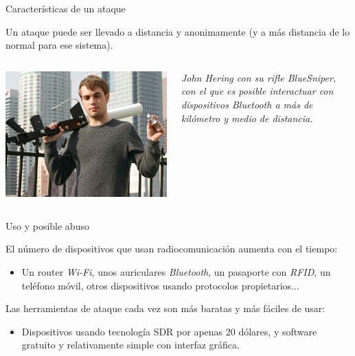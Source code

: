 \documentclass{beamer}
\begin{document}
\begin{frame}{Características de un ataque}

Un ataque puede ser llevado a distancia y anonimamente (y a más distancia de lo normal para ese sistema).

\bigskip

\begin{columns}

\begin{column}{.66\textwidth}
\begin{center}
\includegraphics[scale=0.5]{bluetooth_sniper_rifle.jpg}
\end{center}
\end{column}

\begin{column}{.40\textwidth}
\emph{John Hering con su rifle BlueSniper, con el que es posible interactuar con dispositivos Bluetooth a más de kilómetro y medio de distancia.}
\end{column}

\end{columns}

\end{frame}

\begin{frame}{Uso y posible abuso}

El número de dispositivos que usan radiocomunicación aumenta con el tiempo:

\begin{itemize}
	\item Un router \emph{Wi-Fi}, unos auriculares \emph{Bluetooth}, un pasaporte con \emph{RFID}, un teléfono móvil, otros dispositivos usando protocolos propietarios...
\end{itemize}

Las herramientas de ataque cada vez son más baratas y más fáciles de usar:

\begin{itemize}
	\item Dispositivos usando tecnología SDR por apenas 20 dólares, y software gratuito y relativamente simple con interfaz gráfica.
\end{itemize}

\end{frame}
\end{document}
